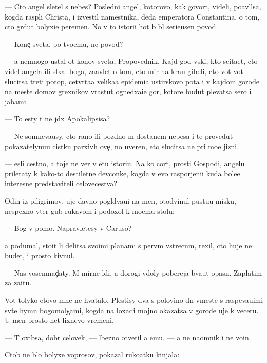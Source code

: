 \documentclass[10pt]{book}
\begin{document}
— Cto angel sletel s nebes? Posledni{\y} angel, kotorovo, kak govor{\ia}t, videli, po{\y}avl{\ia}lsa, kogda rasp{\ia}li Christa, i izvestil namestnika, deda emperatora Constantina, o tom, cto gr{\ia}dut bolyxi{\y}e peremen{\yi}. No v to{\y} istori{\y}i hot{\ia} b{\yi} b{\yi}l serieusen{\yi}{\y} povod.

— Kone{\c} sveta, po-tvo{\y}emu, ne povod?

— {\Y}a nemnogo ustal ot kon{\c}ov sveta, Propovednik. Kajd{\yi}{\y} god vs{\ia}ki{\y}, kto scita{\y}et, cto videl angela ili sl{\yi}xal boga, za{\y}avl{\ia}{\y}et o tom, cto mir na kra{\y}u gibeli, cto vot-vot slucitsa treti{\y} potop, cetv{\e}rta{\y}a velika{\y}a epidemi{\y}a {\y}ustirskovo pota i v kajdom gorode na meste domov grexnikov v{\yi}rastut ogned{\yi}xa{\x}i{\y}e gor{\yi}, kotor{\yi}{\y}e budut plevatsa sero{\y} i jabami.

— To {\y}esty t{\yi} ne jd{\e}x Apokalipsisa?

— Ne somneva{\y}usy, cto rano ili pozdno m{\yi} dostanem nebesa i te provedut pokazatelynu{\y}u cistku parxiv{\yi}h ove{\c}, no uveren, eto slucitsa ne pri mo{\y}e{\y} jizni.

— {\Y}esli cestno, {\y}a toje ne ver{\io} v etu istori{\y}u. Na ko{\y} cort, prosti Gospodi, angelu priletaty k kako{\y}-to des{\ia}tiletne{\y} devconke, kogda v {\y}evo raspor{\ia}jeni{\y}i kuda bole{\y}e interesn{\yi}{\y}e predstaviteli celovecestva?

Odin iz piligrimov, uje davno pogl{\ia}d{\yi}va{\y}u{\x}i{\y} na men{\ia}, otodvinul pustu{\y}u misku, nespexno v{\yi}ter gub{\yi} rukavom i podoxol k mo{\y}emu stolu:

— Bog v pomo{\x}. Napravl{\ia}{\y}etesy v Caruso?

{\Y}a podumal, stoit li delitsa svo{\y}imi planami s perv{\yi}m vstrecn{\yi}m, rexil, cto huje ne budet, i prosto kivnul.

— Nas vosemnad{\c}aty. M{\yi} mirn{\yi}{\y}e l{\io}di, a dorogi vdoly poberej{\y}a b{\yi}va{\y}ut opasn{\yi}. Zaplatim za za{\x}itu.

Vot tolyko etovo mne ne hvatalo. Plestisy dva s polovino{\y} dn{\ia} vmeste s raspeva{\y}u{\x}imi sv{\ia}t{\yi}{\y}e hymn{\yi} bogomoly{\c}ami, kogda na loxadi mojno okazatsa v gorode uje k veceru. U men{\ia} prosto net lixnevo vremeni.

— T{\yi} oxibsa, dobr{\yi}{\y} celovek, — l{\io}bezno otvetil {\y}a {\y}emu. — {\Y}a ne na{\y}omnik i ne vo{\y}in.

Ctob{\yi} ne b{\yi}lo bolyxe voprosov, pokazal ruko{\y}atku kinjala:
\end{document}
